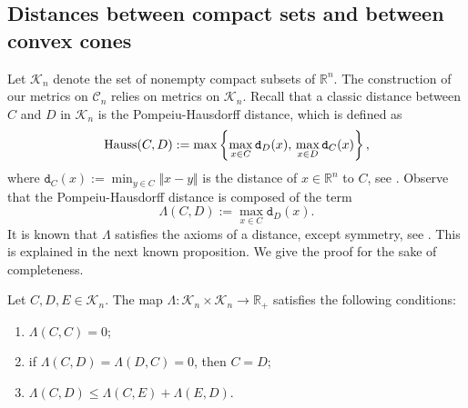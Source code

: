 \documentclass[hidelinks,onefignum,onetabnum]{siamart250211}
\theoremstyle{definition}
\theoremstyle{remark}
\newcommand{\R}{\mathbb R}
\newcommand{\CC}{\mathcal C}
\newcommand{\RR}{\mathbb R}
\newcommand{\dist}{\mathtt{d}}
\begin{document}
\subsection{Distances between compact sets and between convex cones}
Let $\mathcal K_n$ denote the set of nonempty compact subsets of $\R^n$.
The construction of our metrics on $\CC_n$ relies on metrics on  $\mathcal K_n$. Recall that a classic distance between $C$ and $D$ in $\mathcal K_n$ is the Pompeiu-Hausdorff distance, which is defined as
\begin{equation}\label{hauss}
{\rm Hauss}(C,D):=\max\left\{\max_{x\in C}\dist_D(x),\,\max_{x\in D}\dist_C(x)\right\},
\end{equation}
where $\dist_C(x):=\min_{y\in C}\Vert x-y\Vert$ is the distance of $x\in\RR^n$ to $C$, see \cite[Chapter 4]{Rock-Wets}. Observe that the Pompeiu-Hausdorff distance is composed of the term 
\[\Lambda(C,D):=\max_{x\in C}\dist_D(x).\]
It is known that $\Lambda$ satisfies the axioms of a distance, except symmetry, see \cite{Danet,Sendov}. This is explained in the next known proposition. We give the proof for the sake of completeness. 
\begin{proposition}\label{quasi}
Let $C,D,E\in\mathcal K_n$. The map $\Lambda:\mathcal K_n\times\mathcal K_n\to\RR_+$ satisfies the following conditions:
\begin{enumerate}
\item[(a)] $\Lambda(C,C)=0$;
\item[(b)] if $\Lambda(C,D)=\Lambda(D,C)=0$, then $C=D$;
\item[(c)] $\Lambda(C,D)\leq \Lambda(C,E)+\Lambda(E,D)$.
\end{enumerate}
\end{proposition}
\end{document}
